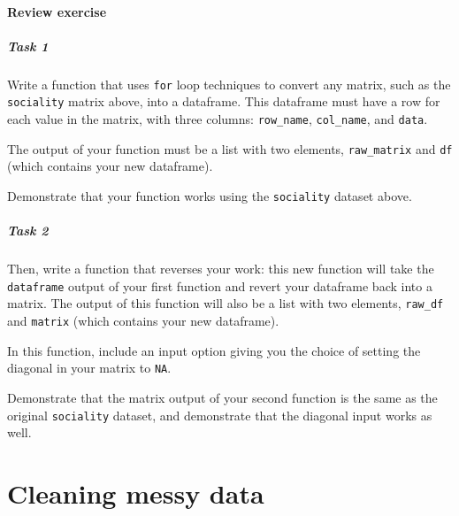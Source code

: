 \documentclass[
]{book}
\begin{document}
\hypertarget{review-exercise-5}{%
\subsubsection*{Review exercise}\label{review-exercise-5}}

\hypertarget{task-1-2}{%
\paragraph*{Task 1}\label{task-1-2}}

Write a function that uses \texttt{for} loop techniques to convert any matrix, such as the \texttt{sociality} matrix above, into a dataframe. This dataframe must have a row for each value in the matrix, with three columns: \texttt{row\_name}, \texttt{col\_name}, and \texttt{data}.

The output of your function must be a list with two elements, \texttt{raw\_matrix} and \texttt{df} (which contains your new dataframe).

Demonstrate that your function works using the \texttt{sociality} dataset above.

\hypertarget{task-2-2}{%
\paragraph*{Task 2}\label{task-2-2}}

Then, write a function that reverses your work: this new function will take the \texttt{dataframe} output of your first function and revert your dataframe back into a matrix. The output of this function will also be a list with two elements, \texttt{raw\_df} and \texttt{matrix} (which contains your new dataframe).

In this function, include an input option giving you the choice of setting the diagonal in your matrix to \texttt{NA}.

Demonstrate that the matrix output of your second function is the same as the original \texttt{sociality} dataset, and demonstrate that the diagonal input works as well.

\hypertarget{cleaning-messy-data}{%
\chapter{Cleaning messy data}\label{cleaning-messy-data}}
\end{document}
